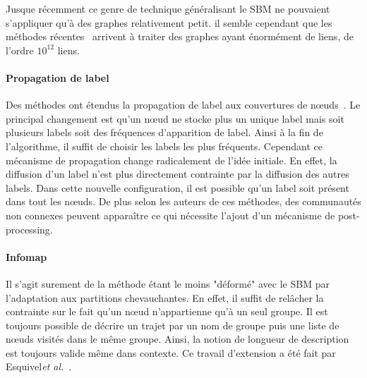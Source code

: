 Jusque récemment ce genre de technique généralisant le SBM ne pouvaient s'appliquer qu'à des graphes relativement petit.
il semble cependant que les méthodes récentes~\cite{Gopalan2013a, Yang2013} arrivent à traiter des graphes ayant énormément de liens, de l'ordre $10^{12}$ liens.



\paragraph{Propagation de label}
Des méthodes ont étendus la propagation de label aux couvertures de n\oe uds~\cite{Gregory2010,Xie2011}.
Le principal changement est qu'un n\oe ud ne stocke plus un unique label mais soit plusieurs labels soit des fréquences d'apparition de label.
Ainsi à la fin de l'algorithme, il suffit de choisir les labels les plus fréquents.
Cependant ce mécanisme de propagation change radicalement de l'idée initiale.
En effet, la diffusion d'un label n'est plus directement contrainte par la diffusion des autres labels.
Dans cette nouvelle configuration, il est possible qu'un label soit présent dans tout les n\oe uds.
De plus selon les auteurs de ces méthodes, des communautés non connexes peuvent apparaître ce qui nécessite l’ajout d’un mécanisme de post-processing.


\paragraph{Infomap}
Il s'agit surement de la méthode étant le moins "déformé" avec le SBM par l'adaptation aux partitions chevauchantes.
En effet, il suffit de relâcher la contrainte sur le fait qu'un n\oe ud n'appartienne qu'à un seul groupe.
Il est toujours possible de décrire un trajet par un nom de groupe puis une liste de n\oe uds visités dans le même groupe.
Ainsi, la notion de longueur de description est toujours valide même dans contexte.
Ce travail d'extension a été fait par Esquivel\emph{et al.}~\cite{Esquivel2011}.

